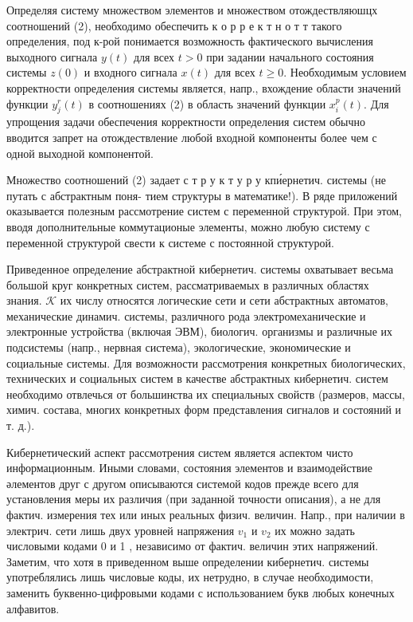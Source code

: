 \documentclass[10pt]{article}
\begin{document}
Определяя систему множеством элементов и множеством отождествляюшцх соотношений (2), необходимо обеспечить к о р р е к т н о т т такого определения, под к-рой понимается возможность фактического вычисления выходного сигнала $y(t)$ для всех $t>0$ при задании начального состояния системы $z(0)$ и входного сигнала $x(t)$ для всех $t \geqslant 0$. Необходимым условием корректности определения системы является, напр., вхождение области значений функции $y_{j}^{r}(t)$ в соотношениях (2) в область значений функции $x_{i}^{p}(t)$. Для упрощения задачи обеспечения корректности определения систем обычно вводится запрет на отождествление любой входной компоненты более чем с одной выходной компонентой.



Множество соотношений (2) задает с т р у к т у р у кпи́ернетич. системы (не путать с абстрактным поня- тием структуры в математике!). В ряде приложений оказывается полезным рассмотрение систем с переменной структурой. При этом, вводя дополнительные коммутационые элементы, можно любую систему с переменной структурой свести к системе с постоянной структурой.



Приведенное определение абстрактной кибернетич. системы охватывает весьма большой круг конкретных систем, рассматриваемых в различных областях знания. $\mathcal{K}$ их числу относятся логические сети и сети абстрактных автоматов, механические динамич. системы, различного рода электромеханические и электронные устройства (включая ЭВМ), биологич. организмы и различные их подсистемы (напр., нервная система), экологические, экономические и социальные системы. Для возможности рассмотрения конкретных биологических, технических и социальных систем в качестве абстрактных кибернетич. систем необходимо отвлечься от большинства их специальных свойств (размеров, массы, химич. состава, многих конкретных форм представления сигналов и состояний и т. д.).



Кибернетический аспект рассмотрения систем является аспектом чисто информационным. Иными словами, состояния элементов и взаимодействие әлементов друг с другом описываются системой кодов прежде всего для установления меры их различия (при заданной точности описания), а не для фактич. измерения тех или иных реальных физич. величин. Напр., при наличии в электрич. сети лишь двух уровней напряжения $v_{1}$ и $v_{2}$ их можно задать числовыми кодами 0 и 1 , независимо от фактич. величин этих напряжений. Заметим, что хотя в приведенном выше определении кибернетич. системы употреблялись лишь числовые коды, их нетрудно, в случае необходимости, заменить буквенно-цифровыми кодами с использованием букв любых конечных алфавитов.
\end{document}
